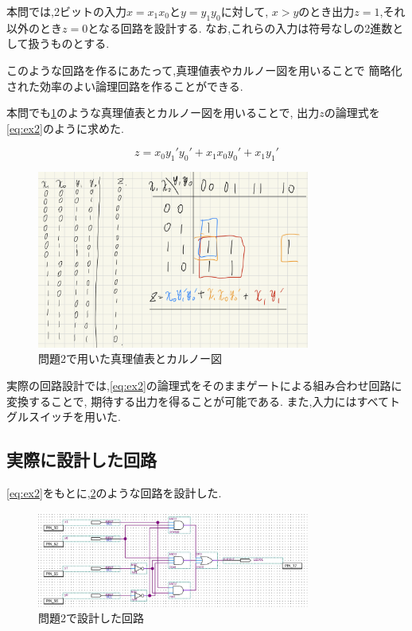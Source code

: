 \documentclass[autodetect-engine, dvi=dvipdfmx, 10pt, a4paper, ja=standard]{bxjsarticle}
\begin{document}
本問では,2ビットの入力$x = x_1 x_0$と$y = y_1 y_0$に対して,
$x > y$のとき出力$z = 1$,それ以外のとき$z = 0$となる回路を設計する.
なお,これらの入力は符号なしの2進数として扱うものとする.

このような回路を作るにあたって,真理値表やカルノー図を用いることで
簡略化された効率のよい論理回路を作ることができる.

本問でも\ref{fig:ex2-karnaugh}のような真理値表とカルノー図を用いることで,
出力$z$の論理式を\ref{eq:ex2}のように求めた.

\begin{equation}
	\label{eq:ex2}
	z = x_0 y_1' y_0' + x_1 x_0 y_0' + x_1 y_1'
\end{equation}



\begin{figure}[htbp]
	\centering
	\includegraphics[width=0.8\textwidth]{asset/ex2_fig.png}
	\caption{問題2で用いた真理値表とカルノー図}
	\label{fig:ex2-karnaugh}
\end{figure}


実際の回路設計では,\ref{eq:ex2}の論理式をそのままゲートによる組み合わせ回路に変換することで,
期待する出力を得ることが可能である.
また,入力にはすべてトグルスイッチを用いた.

\subsection{実際に設計した回路}

\ref{eq:ex2}をもとに,\ref{fig:ex2}のような回路を設計した.

\begin{figure}[htbp]
	\centering
	\includegraphics[width=0.8\textwidth]{asset/ex2_trim.jpg}
	\caption{問題2で設計した回路}
	\label{fig:ex2}
\end{figure}
\end{document}
